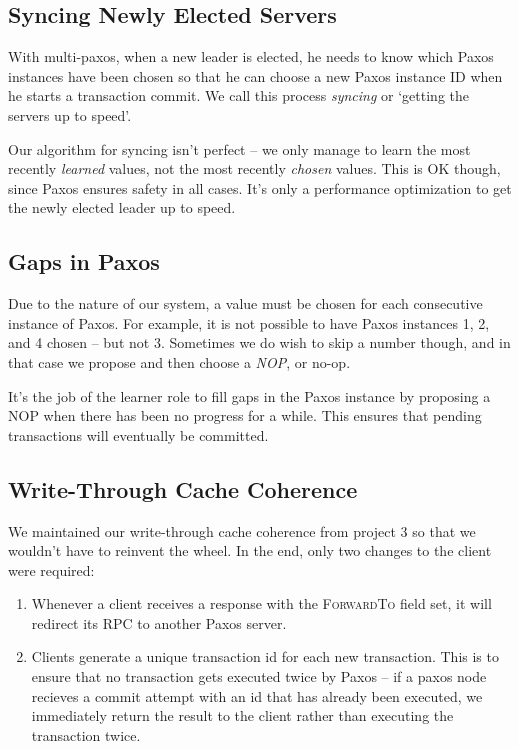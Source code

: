 \documentclass[12pt]{article}
\begin{document}
\subsection{Syncing Newly Elected Servers}

With multi-paxos, when a new leader is elected, he needs to know which Paxos instances have been chosen
so that he can choose a new Paxos instance ID when he starts a transaction commit. We call this process
\emph{syncing} or `getting the servers up to speed'.

Our algorithm for syncing isn't perfect -- we only manage to learn the most recently \emph{learned}
values, not the most recently \emph{chosen} values. This is OK though, since Paxos ensures safety in all
cases. It's only a performance optimization to get the newly elected leader up to speed.

\subsection{Gaps in Paxos}

Due to the nature of our system, a value must be chosen for each consecutive instance of Paxos. For example,
it is not possible to have Paxos instances 1, 2, and 4 chosen -- but not 3. Sometimes we do wish to skip a
number though, and in that case we propose and then choose a \emph{NOP}, or no-op.

It's the job of the learner role to fill gaps in the Paxos instance by proposing a NOP when there has been no
progress for a while. This ensures that pending transactions will eventually be committed.

\subsection{Write-Through Cache Coherence}

We maintained our write-through cache coherence from project 3 so that we wouldn't have to reinvent the wheel. In the end, only two changes to the client were required:

\begin{enumerate}
\item
    Whenever a client receives a response with the \textsc{ForwardTo} field set, it will
    redirect its RPC to another Paxos server.
\item
    Clients generate a unique transaction id for each new transaction. This is to ensure
    that no transaction gets executed twice by Paxos -- if a paxos node recieves a commit
    attempt with an id that has already been executed, we immediately return the result
    to the client rather than executing the transaction twice.
\end{enumerate}
\end{document}
